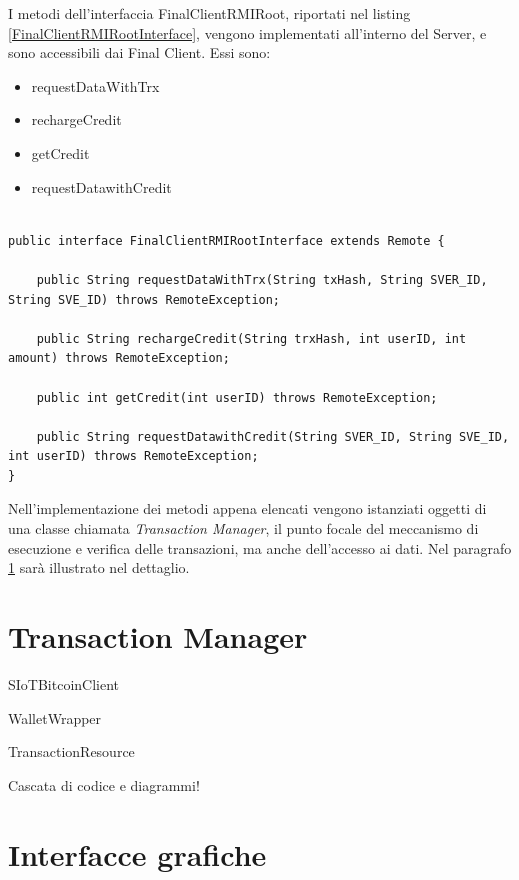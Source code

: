 I metodi dell'interfaccia FinalClientRMIRoot, riportati nel listing \ref{FinalClientRMIRootInterface}, vengono implementati all'interno del Server, e sono accessibili dai Final Client. Essi sono:

\begin{itemize}
    \item requestDataWithTrx
    \item rechargeCredit
    \item getCredit
    \item requestDatawithCredit
\end{itemize}

\begin{lstlisting}[caption={FinalClientRMIRootInterface.java},label={FinalClientRMIRootInterface},style={c}]

public interface FinalClientRMIRootInterface extends Remote {
    
    public String requestDataWithTrx(String txHash, String SVER_ID, String SVE_ID) throws RemoteException;
    
    public String rechargeCredit(String trxHash, int userID, int amount) throws RemoteException;
    
    public int getCredit(int userID) throws RemoteException;
    
    public String requestDatawithCredit(String SVER_ID, String SVE_ID, int userID) throws RemoteException;
}

\end{lstlisting}

Nell'implementazione dei metodi appena elencati vengono istanziati oggetti di una classe chiamata \textit{Transaction Manager}, il punto focale del meccanismo di esecuzione e verifica delle transazioni, ma anche dell'accesso ai dati. Nel paragrafo \ref{c:integr:trxmanager} sarà illustrato nel dettaglio.

\section{Transaction Manager}
\label{c:integr:trxmanager}

SIoTBitcoinClient

WalletWrapper

TransactionResource


Cascata di codice e diagrammi!

\section{Interfacce grafiche}
\label{c:integr:gui}


